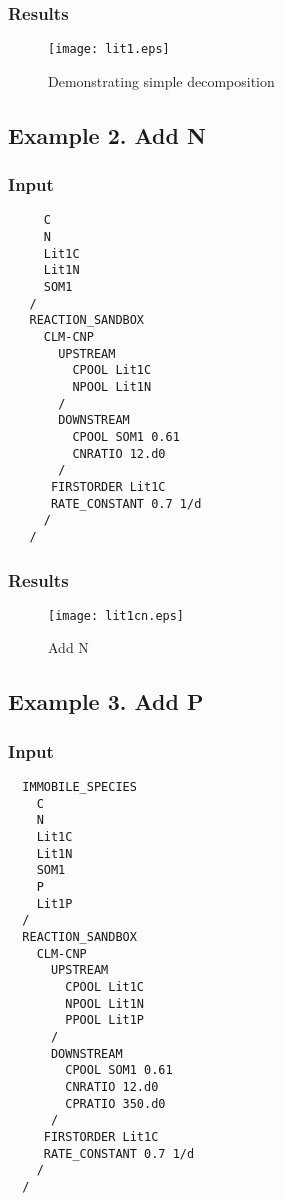 \documentclass[12pt, a4paper]{article}
\begin{document}
\subsubsection{Results}
 \begin{figure}[h]
\centering
\texttt{[image: lit1.eps]}
\caption{Demonstrating simple decomposition}
\end{figure}

\clearpage
\subsection{Example 2. Add N}

\subsubsection{Input}
\begin{verbatim}
     C
     N
     Lit1C
     Lit1N
     SOM1
   /
   REACTION_SANDBOX
     CLM-CNP
       UPSTREAM
         CPOOL Lit1C
         NPOOL Lit1N
       /
       DOWNSTREAM
         CPOOL SOM1 0.61
         CNRATIO 12.d0
       /
      FIRSTORDER Lit1C
      RATE_CONSTANT 0.7 1/d
     /
   /
\end{verbatim}

\subsubsection{Results}
 \begin{figure}[h]
\centering
\texttt{[image: lit1cn.eps]}
\caption{Add N}
\end{figure}

\clearpage
\subsection{Example 3. Add P}
\subsubsection{Input}
\begin{verbatim}
  IMMOBILE_SPECIES
    C   
    N   
    Lit1C
    Lit1N
    SOM1
    P   
    Lit1P
  /
  REACTION_SANDBOX
    CLM-CNP
      UPSTREAM
        CPOOL Lit1C
        NPOOL Lit1N
        PPOOL Lit1P
      /   
      DOWNSTREAM
        CPOOL SOM1 0.61
        CNRATIO 12.d0
        CPRATIO 350.d0
      /   
     FIRSTORDER Lit1C
     RATE_CONSTANT 0.7 1/d 
    /   
  /
\end{verbatim}
\end{document}
